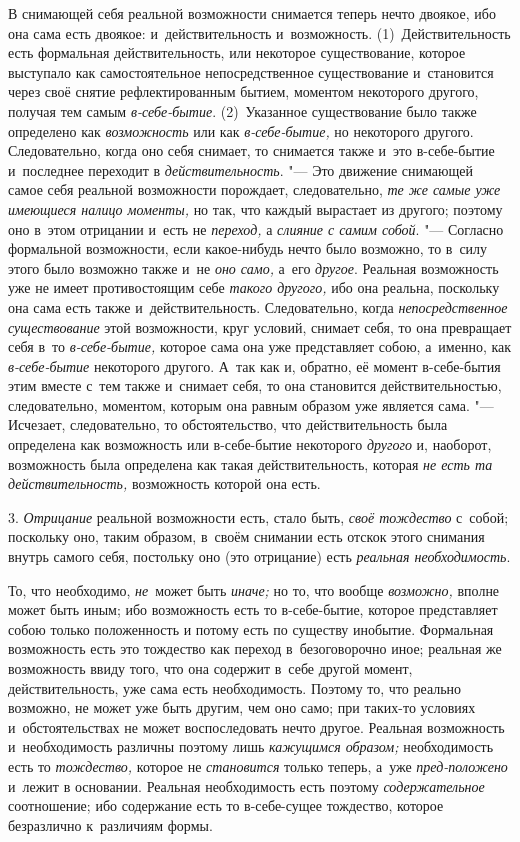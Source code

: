 В снимающей себя реальной возможности снимается теперь нечто двоякое, ибо
она сама есть двоякое: и~действительность и~возможность.
(1)~Действительность есть формальная действительность, или некоторое
существование, которое выступало как самостоятельное непосредственное
существование и~становится через своё снятие рефлектированным бытием,
моментом некоторого другого, получая тем самым
{\em в-себе-бытие}. (2)~Указанное существование было
также определено как {\em возможность} или как
{\em в-себе-бытие,} но некоторого другого.
Следовательно, когда оно себя снимает, то снимается также и~это
в-себе-бытие и~последнее переходит в
{\em действительность}. "--- Это движение снимающей самое
себя реальной возможности порождает, следовательно,
{\em те же самые уже имеющиеся налицо моменты,} но так,
что каждый вырастает из другого; поэтому оно в~этом отрицании и~есть не
{\em переход,} а {\em слияние с
самим собой}. "--- Согласно формальной возможности, если какое-нибудь нечто
было возможно, то в~силу этого было возможно также и~не
{\em оно само,} а~его {\em другое}.
Реальная возможность уже не имеет противостоящим себе
{\em такого другого,} ибо она реальна, поскольку она
сама есть также и~действительность. Следовательно, когда
{\em непосредственное существование} этой возможности,
круг условий, снимает себя, то она превращает себя в~то
{\em в-себе-бытие,} которое сама она уже представляет
собою, а~именно, как {\em в-себе-бытие} некоторого
другого. А~так как и, обратно, её момент в-себе-бытия этим вместе с~тем
также и~снимает себя, то она становится действительностью, следовательно,
моментом, которым она равным образом уже является сама. "--- Исчезает,
следовательно, то обстоятельство, что действительность была определена как
возможность или в-себе-бытие некоторого {\em другого}
и, наоборот, возможность была определена как такая действительность,
которая {\em не есть та действительность,} возможность
которой она есть.

3. {\em Отрицание} реальной возможности есть, стало
быть, {\em своё тождество} с~собой; поскольку оно,
таким образом, в~своём снимании есть отскок этого снимания внутрь самого
себя, постольку оно (это отрицание) есть {\em реальная
необходимость}.

То, что необходимо, {\em не}~может быть {\em иначе;} но то, что вообще
{\em возможно,} вполне может быть иным; ибо возможность
есть то в-себе-бытие, которое представляет собою только положенность и
потому есть по существу инобытие. Формальная возможность есть это тождество
как переход в~безоговорочно иное; реальная же возможность ввиду того, что
она содержит в~себе другой момент, действительность, уже сама есть
необходимость. Поэтому то, что реально возможно, не может уже быть другим,
чем оно само; при таких-то условиях и~обстоятельствах не может
воспоследовать нечто другое. Реальная возможность и~необходимость различны
поэтому лишь {\em кажущимся образом;} необходимость есть то {\em тождество,}
которое не {\em становится} только теперь, а~уже {\em пред-положено} и~лежит
в основании. Реальная необходимость есть поэтому {\em содержательное}
соотношение; ибо содержание есть то в-себе-сущее тождество, которое
безразлично к~различиям формы.

